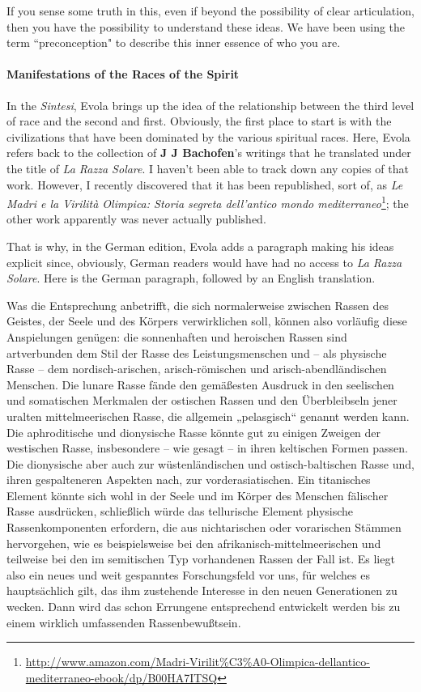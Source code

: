 If you sense some truth in this, even if beyond the possibility of clear articulation, then you have the possibility to understand these ideas. We have been using the term ``preconception" to describe this inner essence of who you are.

\paragraph{Manifestations of the Races of the Spirit}
In the \emph{Sintesi}, Evola brings up the idea of the relationship between the third level of race and the second and first. Obviously, the first place to start is with the civilizations that have been dominated by the various spiritual races. Here, Evola refers back to the collection of \textbf{J J Bachofen}'s writings that he translated under the title of \emph{La Razza Solare}. I haven't been able to track down any copies of that work. However, I recently discovered that it has been republished, sort of, as \emph{Le Madri e la Virilità Olimpica: Storia segreta dell'antico mondo mediterraneo}\footnote{\url{http://www.amazon.com/Madri-Virilit\%C3\%A0-Olimpica-dellantico-mediterraneo-ebook/dp/B00HA7ITSQ}}; the other work apparently was never actually published.

That is why, in the German edition, Evola adds a paragraph making his ideas explicit since, obviously, German readers would have had no access to \emph{La Razza Solare}. Here is the German paragraph, followed by an English translation.

\begin{quotex}
Was die Entsprechung anbetrifft, die sich normalerweise zwischen Rassen des Geistes, der Seele und des Körpers verwirklichen soll, können also vorläufig diese Anspielungen genügen: die sonnenhaften und heroischen Rassen sind artverbunden dem Stil der Rasse des Leistungsmenschen und – als physische Rasse – dem nordisch-arischen, arisch-römischen und arisch-abendländischen Menschen. Die lunare Rasse fände den gemäßesten Ausdruck in den seelischen und somatischen Merkmalen der ostischen Rassen und den Überbleibseln jener uralten mittelmeerischen Rasse, die allgemein „pelasgisch`` genannt werden kann. Die aphroditische und dionysische Rasse könnte gut zu einigen Zweigen der westischen Rasse, insbesondere – wie gesagt – in ihren keltischen Formen passen. Die dionysische aber auch zur wüstenländischen und ostisch-baltischen Rasse und, ihren gespalteneren Aspekten nach, zur vorderasiatischen. Ein titanisches Element könnte sich wohl in der Seele und im Körper des Menschen fälischer Rasse ausdrücken, schließlich würde das tellurische Element physische Rassenkomponenten erfordern, die aus nichtarischen oder vorarischen Stämmen hervorgehen, wie es beispielsweise bei den afrikanisch-mittelmeerischen und teilweise bei den im semitischen Typ vorhandenen Rassen der Fall ist. Es liegt also ein neues und weit gespanntes Forschungsfeld vor uns, für welches es hauptsächlich gilt, das ihm zustehende Interesse in den neuen Generationen zu wecken. Dann wird das schon Errungene entsprechend entwickelt werden bis zu einem wirklich umfassenden Rassenbewußtsein. 

\end{quotex}

